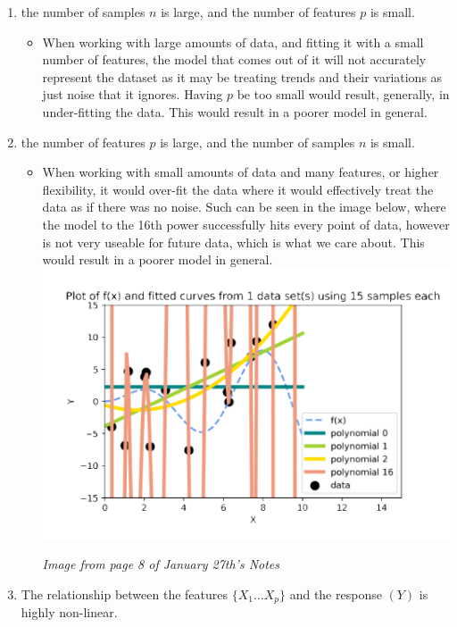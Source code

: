 \documentclass[11pt]{article}
\begin{document}
\begin{enumerate}[label=(\alph*)]
    \item the number of samples $n$ is large, and the number of features $p$ is small.
          \begin{itemize}
              \item When working with large amounts of data, and fitting it with a small number of features, the model that comes out of it will not accurately represent the dataset as it may be treating trends and their variations as just noise that it ignores. Having $p$ be too small would result, generally, in under-fitting the data. This would result in a poorer model in general.
          \end{itemize}
    \item the number of features $p$ is large, and the number of samples $n$ is small.
          \begin{itemize}
              \item When working with small amounts of data and many features, or higher flexibility, it would over-fit the data where it would effectively treat the data as if there was no noise. Such can be seen in the image below, where the model to the 16th power successfully hits every point of data, however is not very useable for future data, which is what we care about. This would result in a poorer model in general.\\
                    \includegraphics{1b.png}
                    \begin{center}
                        \emph{Image from page 8 of January 27th's Notes}
                    \end{center}
          \end{itemize}
    \item The relationship between the features  $\{X_1 ... X_p\}$ and the response $(Y)$ is highly non-linear.

\end{enumerate}
\end{document}
